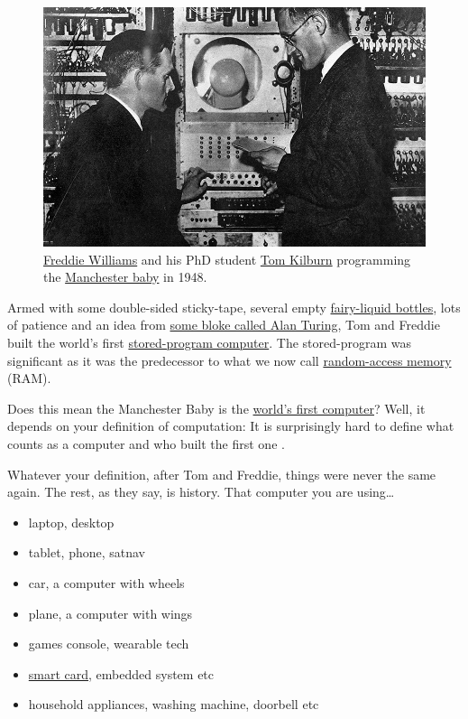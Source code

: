 \documentclass[
  12pt,
]{book}
\providecommand{\tightlist}{%
  \setlength{\itemsep}{0pt}\setlength{\parskip}{0pt}}
\begin{document}
\begin{figure}

{\centering \includegraphics[width=0.99\linewidth]{images/kilburn_williams_manchester_baby} 

}

\caption{\href{https://en.wikipedia.org/wiki/Frederic_Calland_Williams}{Freddie Williams} and his PhD student \href{https://en.wikipedia.org/wiki/Tom_Kilburn}{Tom Kilburn} programming the \href{https://en.wikipedia.org/wiki/Manchester_Baby}{Manchester baby} in 1948.}\label{fig:tomfred-fig}
\end{figure}



Armed with some double-sided sticky-tape, several empty \href{https://en.wikipedia.org/wiki/Fairy_(brand)}{fairy-liquid bottles}, lots of patience and an idea from \href{https://en.wikipedia.org/wiki/Alan_Turing}{some bloke called Alan Turing}, Tom and Freddie built the world's first \href{https://en.wikipedia.org/wiki/Stored-program_computer}{stored-program computer}. The stored-program was significant as it was the predecessor to what we now call \href{https://en.wikipedia.org/wiki/Random-access_memory}{random-access memory} (RAM).

Does this mean the Manchester Baby is the \href{https://www.computerhope.com/issues/ch000984.htm}{world's first computer}? Well, it depends on your definition of computation: It is surprisingly hard to define what counts as a computer and who built the first one \citep{firstcomputer}.

Whatever your definition, after Tom and Freddie, things were never the same again. The rest, as they say, is history. That computer you are using\ldots{}

\begin{itemize}
\tightlist
\item
  laptop, desktop
\item
  tablet, phone, satnav
\item
  car, a computer with wheels
\item
  plane, a computer with wings
\item
  games console, wearable tech
\item
  \href{https://en.wikipedia.org/wiki/Smart_card}{smart card}, embedded system etc
\item
  household appliances, washing machine, doorbell etc
\end{itemize}
\end{document}
